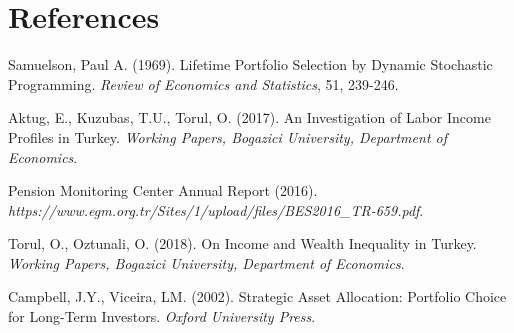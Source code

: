 \chapter*{References}

\begin{description}

\item Samuelson, Paul A. (1969). Lifetime Portfolio Selection by Dynamic Stochastic Programming. \textit{Review of Economics and Statistics}, 51, 239-246.
 
\item Aktug, E., Kuzubas, T.U., Torul, O. (2017). An Investigation of Labor Income Profiles in Turkey. \textit{Working Papers, Bogazici University, Department of Economics}.

\item Pension Monitoring Center Annual Report (2016). \textit{https://www.egm.org.tr/Sites/1/upload/files/BES2016\_TR-659.pdf}.

\item Torul, O., Oztunali, O. (2018). On Income and Wealth Inequality in Turkey. \textit{Working Papers, Bogazici University, Department of Economics}.

\item Campbell, J.Y., Viceira, LM. (2002). Strategic Asset Allocation: Portfolio Choice for Long-Term Investors. \textit{Oxford University Press}.






\end{description}

